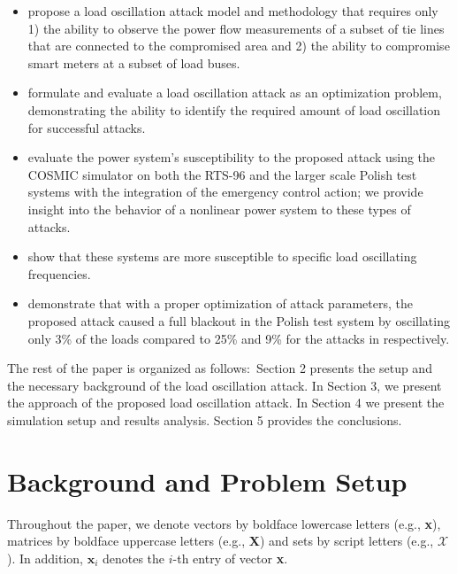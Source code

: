 \documentclass[journal]{IEEEtran}
\begin{document}
\begin{itemize}
  \item  propose a load oscillation attack model and methodology that requires only 1) the ability to observe the power flow measurements of a subset of tie lines that are connected to the compromised area and 2) the ability to compromise smart meters at a subset of load buses.
  \item  formulate and evaluate a load oscillation attack as an optimization problem, demonstrating the ability to identify the required amount of load oscillation for successful attacks.
  \item  evaluate the power system's susceptibility to the proposed attack using the COSMIC simulator on both the RTS-96 and the larger scale Polish test systems with the integration of the emergency control action; we provide insight into the behavior of a nonlinear power system to these types of attacks. 
  \item  show that these systems are more susceptible to specific load oscillating frequencies. 
  \item demonstrate that with a proper optimization of attack parameters, the proposed attack caused a full blackout in the Polish test system by oscillating only 3\% of the loads compared to 25\% and 9\% for the attacks in  \cite{Anu, carter} respectively.
\end{itemize} 

The rest of the paper is organized as follows:~Section 2 presents the setup and the necessary background of the load oscillation attack. In Section 3, we present the approach of the proposed load oscillation attack. In Section 4 we present the simulation setup and results analysis. Section 5 provides the conclusions. %

  

         
\section{Background and Problem Setup}  

Throughout the paper, we denote vectors by boldface lowercase letters (e.g., \textbf{x}), matrices by boldface uppercase letters (e.g., \textbf{X}) and sets by script letters (e.g., $\mathcal{X}$). In addition, $\textbf{x}_i$ denotes the $i$-th entry of vector \textbf{x}.   
\end{document}
